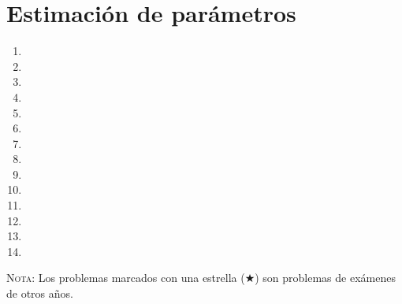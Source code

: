 \documentclass[a4paper,titlepage,dvips]{article}
\begin{document}
\section{Estimación de parámetros}
\begin{enumerate}[leftmargin=*,resume]
\item {}
\item {}
\item {}
\item {}
\item {}
\item {}
\item {}
\item {}
\item {}
\item {}
\item {}
\item {}
\item {}
\item {}
\end{enumerate}

\vspace{2cm}

\textsc{Nota}: Los problemas marcados con una estrella ($\bigstar$) son problemas de
exámenes de otros años.
\end{document}
